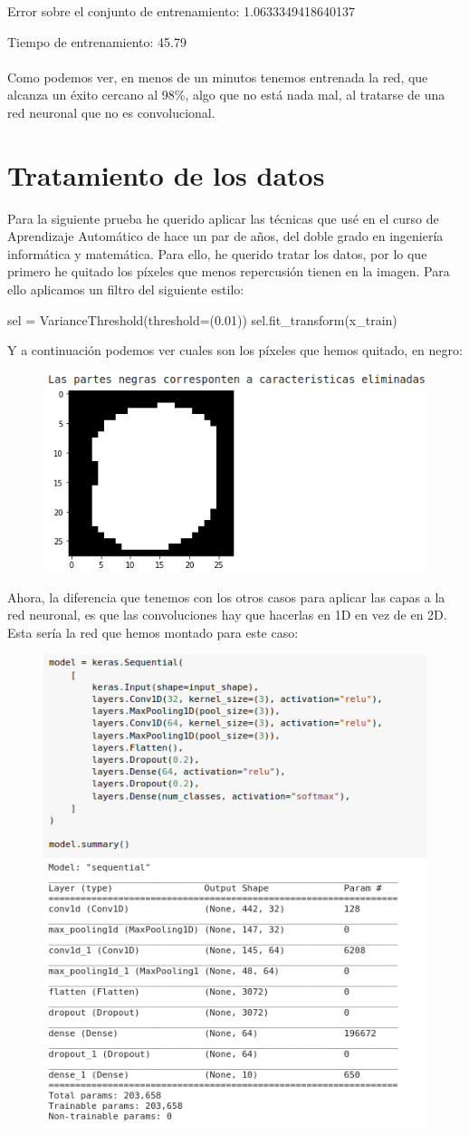 Error sobre el conjunto de entrenamiento: 1.0633349418640137

Tiempo de entrenamiento: 45.79
\\\\

Como podemos ver, en menos de un minutos tenemos entrenada la red, que alcanza un éxito cercano al 98\%, algo que no está nada mal, al tratarse de una red neuronal que no es convolucional.

\section{Tratamiento de los datos}

Para la siguiente prueba he querido aplicar las técnicas que usé en el curso de Aprendizaje Automático de hace un par de años, del doble grado en ingeniería informática y matemática. Para ello, he querido tratar los datos, por lo que primero he quitado los píxeles que menos repercusión tienen en la imagen. Para ello aplicamos un filtro del siguiente estilo:

sel = VarianceThreshold(threshold=(0.01))
sel.fit\_transform(x\_train)

Y a continuación podemos ver cuales son los píxeles que hemos quitado, en negro:

\begin{figure}[H]
	\centering
	\includegraphics[width=0.7\linewidth]{caracteristicas_eliminadas}
	\label{fig:caracteristicaseliminadas}
\end{figure}

Ahora, la diferencia que tenemos con los otros casos para aplicar las capas a la red neuronal, es que las convoluciones hay que hacerlas en 1D en vez de en 2D. Esta sería la red que hemos montado para este caso:

\begin{figure}[H]
	\centering
	\includegraphics[width=0.4\linewidth]{tratamineto-datos}
	\label{fig:tratamineto-datos}
\end{figure}


